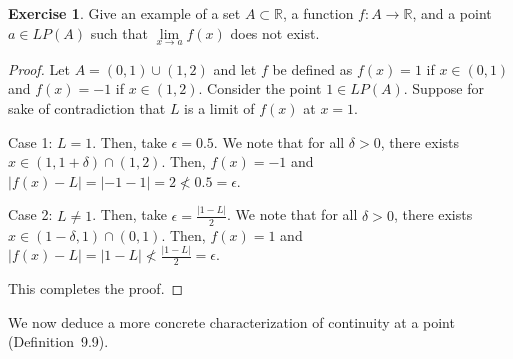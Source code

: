 \documentclass[11pt]{article}
\newcommand{\bbR}{\mathbb{R}}
\renewcommand{\_}[1]{\underline{ #1 }}
\theoremstyle{definition}
\newtheorem{exercise}[theorem]{Exercise}
\numberwithin{equation}{subsection}
\begin{document}
\begin{exercise} 
	Give an example of a set $A \subset \bbR$, a function $f\colon A \to \bbR$, and a point $a \in LP(A)$ such that $\lim\limits_{x \to a} f(x)$ does not exist.

\begin{proof}
Let $A=(0,1)\cup(1,2)$ and let $f$ be defined as $f(x)=1$ if $x\in (0,1)$ and $f(x)=-1$ if $x \in (1,2)$. Consider the point $1\in LP(A)$. Suppose for sake of contradiction that $L$ is a limit of $f(x)$ at $x=1$. 

Case 1: $L=1$. Then, take $\epsilon = 0.5$. We note that for all $\delta>0$, there exists $x \in (1, 1+\delta)\cap (1,2)$. Then, $f(x)=-1$ and $|f(x)-L|=|-1-1|=2\not < 0.5 = \epsilon$. 

Case 2: $L \neq 1$. Then, take $\epsilon = \frac{|1-L|}{2}$. We note that for all $\delta>0$, there exists $x \in (1-\delta,1)\cap (0,1)$. Then, $f(x)=1$ and $|f(x)-L|=|1-L|\not < \frac{|1-L|}{2} = \epsilon$. 

This completes the proof.


\renewcommand\qedsymbol{QED}
\end{proof}


\end{exercise}

We now deduce a more concrete characterization of continuity at a point (Definition~9.9).
\end{document}
